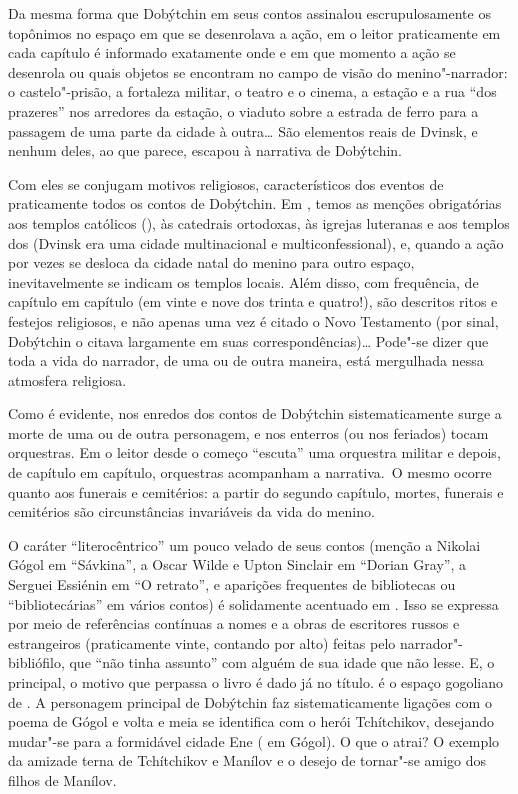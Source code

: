 \begin{multicols}{2}
\vspace{\baselineskip}

Da mesma forma que Dobýtchin em seus contos assinalou escrupulosamente
os topônimos no espaço em que se desenrolava a ação, em {} o leitor praticamente em cada capítulo é informado exatamente onde
e em que momento a ação se desenrola ou quais objetos se encontram no
campo de visão do menino"-narrador: o castelo"-prisão, a fortaleza
militar, o teatro e o cinema, a estação e a rua ``dos prazeres'' nos
arredores da estação, o viaduto sobre a estrada de ferro para a passagem
de uma parte da cidade à outra\ldots{} São elementos reais de Dvinsk, e
nenhum deles, ao que parece, escapou à narrativa de Dobýtchin.

Com eles se conjugam motivos religiosos, característicos dos eventos de
praticamente todos os contos de Dobýtchin. Em {}, temos
as menções obrigatórias aos templos católicos ({}), às
catedrais ortodoxas, às igrejas luteranas e aos templos dos {} (Dvinsk era uma cidade multinacional e multiconfessional), e,
quando a ação por vezes se desloca da cidade natal do menino para outro
espaço, inevitavelmente se indicam os templos locais. Além disso, com
frequência, de capítulo em capítulo (em vinte e nove dos trinta e
quatro!), são descritos ritos e festejos religiosos, e não apenas uma
vez é citado o Novo Testamento (por sinal, Dobýtchin o citava largamente
em suas correspondências)\ldots{} Pode"-se dizer que toda a vida do narrador,
de uma ou de outra maneira, está mergulhada nessa atmosfera religiosa.

Como é evidente, nos enredos dos contos de Dobýtchin sistematicamente
surge a morte de uma ou de outra personagem, e nos enterros (ou nos
feriados) tocam orquestras. Em {} o leitor desde o
começo ``escuta'' uma orquestra militar e depois, de capítulo em
capítulo, orquestras acompanham a narrativa.~O mesmo ocorre quanto aos
funerais e cemitérios: a partir do segundo capítulo, mortes, funerais e
cemitérios são circunstâncias invariáveis da vida do menino.

O caráter ``literocêntrico'' um pouco velado de seus contos
(menção a Nikolai Gógol em ``Sávkina'', a Oscar Wilde e Upton Sinclair
em ``Dorian Gray'', a Serguei Essiénin em ``O retrato'', e aparições
frequentes de bibliotecas ou ``bibliotecárias'' em vários contos) é
solidamente acentuado em {}. Isso se expressa por meio
de referências contínuas a nomes e a obras de escritores russos e
estrangeiros (praticamente vinte, contando por alto) feitas pelo
narrador"-bibliófilo, que ``não tinha assunto'' com alguém de sua idade
que não lesse. E, o principal, o motivo que perpassa o livro é dado já
no título. {} é o espaço gogoliano de {}. A personagem principal de Dobýtchin faz sistematicamente
ligações com o poema de Gógol e volta e meia se identifica com o herói
Tchítchikov, desejando mudar"-se para a formidável cidade Ene ({}
em Gógol). O que o atrai? O exemplo da amizade terna de Tchítchikov e
Manílov e o desejo de tornar"-se amigo dos filhos de Manílov.


\end{multicols}
